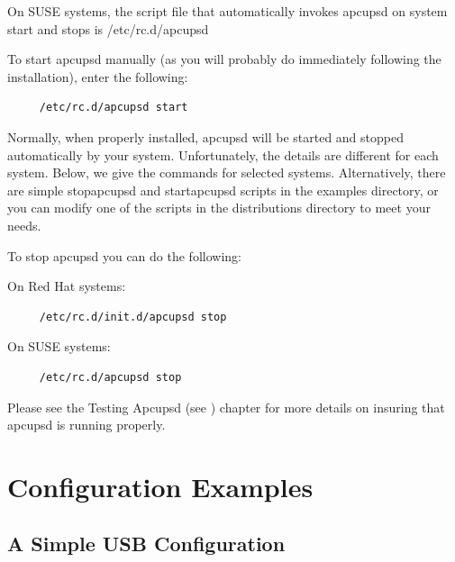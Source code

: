 On SUSE systems, the script file that automatically invokes apcupsd on system
start and stops is /etc/rc.d/apcupsd  

To start apcupsd manually (as you will probably do immediately following the
installation), enter the following: 

\footnotesize
\begin{verbatim}
     /etc/rc.d/apcupsd start
\end{verbatim}
\normalsize

Normally, when properly installed, apcupsd will be started and stopped
automatically by your system. Unfortunately, the details are different for
each system. Below, we give the commands for selected systems. Alternatively,
there are simple stopapcupsd and startapcupsd scripts in the examples
directory, or you can modify one of the scripts in the distributions directory
to meet your needs.  

To stop apcupsd you can do the following:  

On Red Hat systems: 

\footnotesize
\begin{verbatim}
     /etc/rc.d/init.d/apcupsd stop
\end{verbatim}
\normalsize

On SUSE systems: 

\footnotesize
\begin{verbatim}
     /etc/rc.d/apcupsd stop
\end{verbatim}
\normalsize

Please see the Testing Apcupsd (see 
) chapter for more details
on insuring that apcupsd is running properly. 

\label{Configuration-Examples}

\section*{Configuration Examples}

\label{index-Configuration_002c-Examples-63}
\label{index-Examples_002c-Configuration-64}

\label{A-Simple-USB-Configuration}

\subsection*{A Simple USB Configuration}

